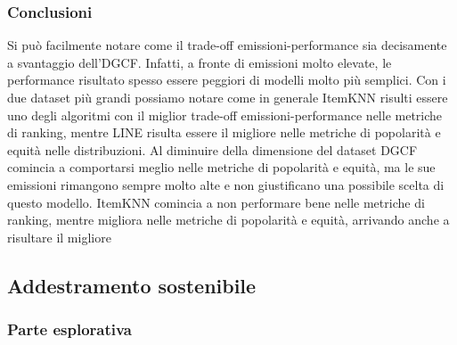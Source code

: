 \subsubsection{Conclusioni}

Si può facilmente notare come il trade-off emissioni-performance sia decisamente a svantaggio dell'DGCF. Infatti, a fronte di emissioni molto elevate, le performance risultato spesso essere peggiori di modelli molto più semplici.
Con i due dataset più grandi possiamo notare come in generale ItemKNN risulti essere uno degli algoritmi con il miglior trade-off emissioni-performance nelle metriche di ranking, mentre LINE risulta essere il migliore nelle metriche di popolarità e equità nelle distribuzioni.
Al diminuire della dimensione del dataset DGCF comincia a comportarsi meglio nelle metriche di popolarità e equità, ma le sue emissioni rimangono sempre molto alte e non giustificano una possibile scelta di questo modello.
ItemKNN comincia a non performare bene nelle metriche di ranking, mentre migliora nelle metriche di popolarità e equità, arrivando anche a risultare il migliore




\subsection{Addestramento sostenibile}
\subsubsection{Parte esplorativa}
